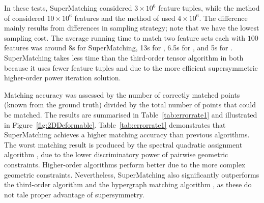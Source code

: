 In these tests, SuperMatching considered $3\times 10^6$ feature tuples, while the method of \cite{Duchenne09} considered $10\times 10^6$ features  and the method of \cite{Zass08} used $4\times 10^6$.
The difference mainly results from differences in sampling strategy; note that we have the lowest  sampling cost.
The average running time to match two feature sets each with $100$ features was around 8s for SuperMatching, 13s for \cite{Duchenne09}, 6.5s for \cite{Zass08}, and 5s for \cite{Cour06}.
SuperMatching takes less time than the third-order tensor algorithm in \cite{Duchenne09} both because it uses fewer feature tuples and due to the more efficient supersymmetric higher-order power iteration solution.

Matching accuracy was assessed by the number of correctly matched points (known from the  ground truth) divided by the total number of points that could be matched.
The results are summarised in Table~\ref{tab:errorrate1} and illustrated in Figure~\ref{fig:2DDeformable}.
Table~\ref{tab:errorrate1} demonstrates that SuperMatching achieves a higher matching accuracy than previous algorithms.
The worst matching result is produced by the spectral quadratic assignment algorithm \cite{Cour06},
due to the lower discriminatory power of pairwise geometric constraints.
Higher-order algorithms perform better due to the more complex geometric constraints.
Nevertheless, SuperMatching also significantly outperforms the third-order algorithm \cite{Duchenne09} and the hypergraph matching algorithm \cite{Zass08},
as these do not tale proper advantage of supersymmetry.

